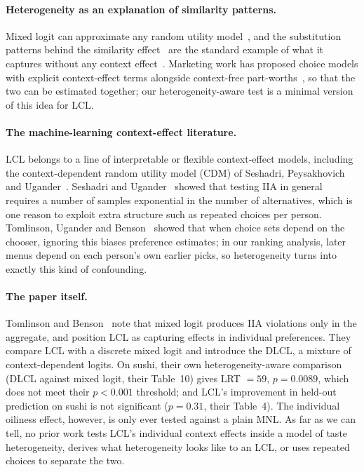 \documentclass[11pt,a4paper]{article}
\theoremstyle{remark}
\begin{document}
\paragraph{Heterogeneity as an explanation of similarity patterns.}
Mixed logit can approximate any random utility model~\cite{mcfadden00}, and the substitution patterns
behind the similarity effect~\cite{tversky72} are the standard example of what it captures without any
context effect~\cite{train09}. Marketing work has proposed choice models with explicit context-effect terms
alongside context-free part-worths~\cite{rvb11}, so that the two can be estimated together; our
heterogeneity-aware test is a minimal version of this idea for LCL.

\paragraph{The machine-learning context-effect literature.}
LCL belongs to a line of interpretable or flexible context-effect models, including the context-dependent
random utility model (CDM) of Seshadri, Peysakhovich and Ugander~\cite{spu19}. Seshadri and
Ugander~\cite{su20} showed that testing IIA in general requires a number of samples exponential in the number
of alternatives, which is one reason to exploit extra structure such as repeated choices per person.
Tomlinson, Ugander and Benson~\cite{tub21} showed that when choice sets depend on the chooser, ignoring this
biases preference estimates; in our ranking analysis, later menus depend on each person's own earlier picks,
so heterogeneity turns into exactly this kind of confounding.

\paragraph{The paper itself.}
Tomlinson and Benson~\cite{tb21} note that mixed logit produces IIA violations only in the aggregate, and
position LCL as capturing effects in individual preferences. They compare LCL with a discrete mixed logit and
introduce the DLCL, a mixture of context-dependent logits. On sushi, their own heterogeneity-aware comparison
(DLCL against mixed logit, their Table~10) gives LRT $=59$, $p=0.0089$, which does not meet their
$p<0.001$ threshold; and LCL's improvement in held-out prediction on sushi is not significant ($p=0.31$, their
Table~4). The individual oiliness effect, however, is only ever tested against a plain MNL. As far as we can
tell, no prior work tests LCL's individual context effects inside a model of taste heterogeneity, derives
what heterogeneity looks like to an LCL, or uses repeated choices to separate the two.
\end{document}
